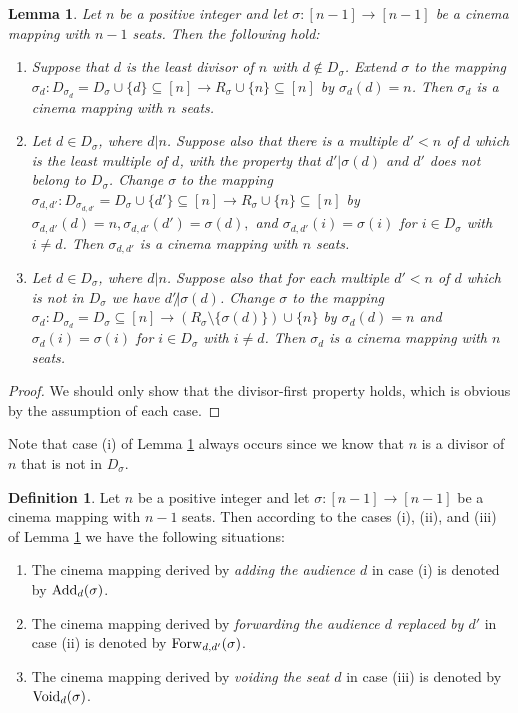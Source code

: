 \documentclass{amsart}
\newtheorem{lemma}[theorem]{Lemma}
\theoremstyle{definition}
\newtheorem{definition}[theorem]{Definition}
\begin{document}
\begin{lemma}\label{extend}
Let $n$ be a positive integer and let $\sigma:[n-1]\to[n-1]$ be a cinema mapping with $n-1$ seats. Then the following hold:
\begin{enumerate}
\item[i.] Suppose that $d$ is the least divisor of $n$ with $d\notin D_\sigma$. Extend $\sigma$ to the mapping $\sigma_d:D_{\sigma_d}=D_\sigma\cup\{d\}\subseteq[n]\to R_\sigma\cup\{n\}\subseteq[n]$ by $\sigma_d(d)=n$. Then $\sigma_d$ is a cinema mapping with $n$ seats.
\item[ii.] Let $d\in D_\sigma$, where $d|n$. Suppose also that there is a multiple $d'<n$ of $d$ which is the least multiple of $d$, with the property that $d'|\sigma(d)$ and $d'$ does not belong to $D_\sigma$. Change $\sigma$ to the mapping $\sigma_{d,d'}:D_{\sigma_{d,d'}}=D_\sigma\cup\{d'\}\subseteq[n]\to R_\sigma\cup\{n\}\subseteq[n]$ by $\sigma_{d,d'}(d)=n, \sigma_{d,d'}(d')=\sigma(d),$ and $\sigma_{d,d'}(i)=\sigma(i)$ for $i\in D_\sigma$ with $i\neq d$. Then $\sigma_{d,d'}$ is a cinema mapping with $n$ seats. 
\item[iii.] Let $d\in D_\sigma$, where $d|n$. Suppose also that for each multiple $d'<n$ of $d$ which is not in $D_\sigma$ we have $d'\not| \sigma(d)$. Change $\sigma$ to the mapping $\sigma_d:D_{\sigma_d}=D_\sigma\subseteq[n]\to (R_\sigma\setminus\{\sigma(d)\})\cup\{n\}$ by $\sigma_d(d)=n$ and $\sigma_d(i)=\sigma(i)$ for $i\in D_\sigma$ with $i\neq d$. Then $\sigma_d$ is a cinema mapping with $n$ seats. 
\end{enumerate}
\end{lemma}

\begin{proof}
We should only show that the divisor-first property holds, which is obvious by the assumption of each case. 
\end{proof}

Note that case (i) of Lemma \ref{extend} always occurs since we know that $n$ is a divisor of $n$ that is not in $D_\sigma$.

\begin{definition}
Let $n$ be a positive integer and let $\sigma:[n-1]\to[n-1]$ be a cinema mapping with $n-1$ seats. Then according to the cases (i), (ii), and (iii) of Lemma \ref{extend} we have the following situations:
\begin{enumerate}
\item[i.] The cinema mapping derived by \textit{adding the audience $d$} in case (i) is denoted by ${\rm Add}_d(\sigma)$. 
\item[ii.] The cinema mapping derived by \textit{forwarding the audience $d$ replaced by $d'$} in case (ii) is denoted by ${\rm Forw}_{d,d'}(\sigma)$. 
\item[iii.] The cinema mapping derived by \textit{voiding the seat $d$} in case (iii) is denoted by ${\rm Void}_d(\sigma)$. 
\end{enumerate}
\end{definition}
\end{document}
